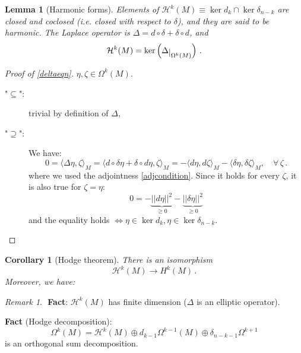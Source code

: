\documentclass[a4paper,11pt,titlepage, article, oneside]{memoir}
\numberwithin{equation}{section}
\newtheorem{corollary}[theorem]{Corollary}
\newtheorem{lemma}[theorem]{Lemma}
\theoremstyle{definition}
\theoremstyle{remark}
\newtheorem{remark}[theorem]{Remark}
\newcommand{\restrict}[2]{{#1}\raisebox{-.5ex}{$|$}_{#2}}
\begin{document}
\begin{lemma}[Harmonic forms]
Elements of $\mathcal{H}^k(M) \equiv \ker d_k \cap \ker \delta_{n-k}$ are closed and coclosed (i.e. closed with respect to $\delta$), and they are said to be harmonic. The Laplace operator is $\Delta = d \circ \delta + \delta \circ d$, and 
\begin{equation} \label{deltaeqn}
\mathcal{H}^k(M) = \ker \left ( \restrict{\Delta}{\Omega^k(M)} \right ) \, .
\end{equation}
\end{lemma}
\begin{proof}[Proof of \ref{deltaeqn}]
$\eta, \zeta \in \Omega^k(M)$.
\begin{description}
\item["$\subseteq$":] trivial by definition of $\Delta$,
\item["$\supseteq$":]  We have:
$$0 = \langle \Delta \eta, \zeta \rangle_M = \langle d \circ \delta \eta + \delta \circ d \eta, \zeta \rangle_M =- \langle d \eta, d \zeta \rangle_M - \langle \delta \eta, \delta \zeta \rangle_M, \quad \forall\, \zeta \, .$$
where we used the adjointness \eqref{adjcondition}. Since it holds for every $\zeta$, it is also true for $\zeta = \eta$:
$$0 = - \underbrace{|| d \eta ||^2}_{\ge 0} - \underbrace{||\delta \eta||^2}_{\ge 0}$$
and the equality holds $\Leftrightarrow \eta \in \ker d_k, \eta \in \ker \delta_{n-k}$.\qedhere
\end{description}
\end{proof}

\begin{corollary}[Hodge theorem] There is an isomorphism
\begin{equation}
\mathcal{H}^k(M) \rightarrow H^k(M) \, .
\end{equation}
Moreover, we have:
\begin{center}
\end{center}
\end{corollary}

\begin{remarkbox}\begin{remark}
$ $\newline
\textbf{Fact}: $\mathcal{H}^k(M)$ has finite dimension ($\Delta$ is an elliptic operator).

\textbf{Fact} (Hodge decomposition):
$$\Omega^k(M) = \mathcal{H}^k(M) \oplus d_{k-1} \Omega^{k-1}(M) \oplus \delta_{n-k-1} \Omega^{k+1}$$
is an orthogonal sum decomposition.
\end{remark} \end{remarkbox}
\end{document}
